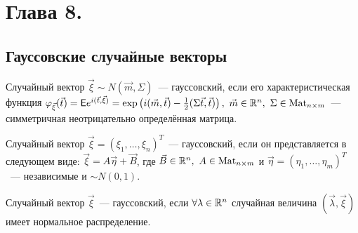 \section{Глава 8.}
\subsection{Гауссовские случайные векторы}
	\begin{definition}[1]
		Случайный вектор $\vec{\xi} \sim N(\vec{m}, \Sigma)$~--- гауссовский, если его характеристическая функция $\varphi_{\vec{\xi}}(\vec{t}) = \mathsf{E} e^{i(\vec{t},\vec{\xi})} = \exp\left(i(\vec{m}, \vec{t}) - \frac{1}{2}(\Sigma \vec{t}, \vec{t})\right), ~ \vec{m} \in \mathbb{R}^n, ~\Sigma \in \operatorname{Mat}_{n \times m}$~--- симметричная неотрицательно определённая матрица.
	\end{definition}

	\begin{definition}[2]
		Случайный вектор $\vec{\xi}  = (\xi_1, \dots, \xi_n)^T$~--- гауссовский, если он представляется в следующем виде: $\vec{\xi} = A\vec{\eta} + \vec{B}$, где $\vec{B} \in \mathbb{R}^n, ~A\in \operatorname{Mat}_{n\times m}$ и $\vec{\eta} = (\eta_1, \ldots, \eta_m)^T$~--- независимые и $\sim N(0, 1)$.
	\end{definition}

	\begin{definition}[3]
		Случайный вектор $\vec{\xi}$~--- гауссовский, если \(\forall \lambda \in \mathbb{R}^n\) случайная величина \((\vec{\lambda}, \vec{\xi})\) имеет нормальное распределение.
	\end{definition}

